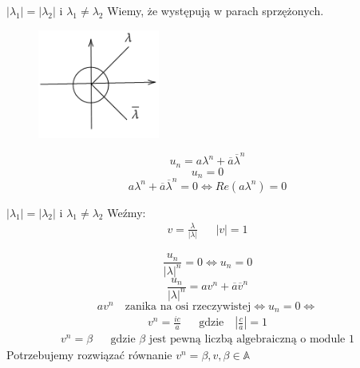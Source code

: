 \documentclass[handout]{beamer}
\def\A{\mathbb{A}}
\theoremstyle{definition}
\theoremstyle{named}
\begin{document}
\begin{frame}{$|\lambda_1| = |\lambda_2|$ i $\lambda_1 \neq \lambda_2$}
Wiemy, że występują w parach sprzężonych. 

\begin{figure}
    \centering
    \includegraphics[width=40mm]{img/skolem-1.png}
\end{figure}

\pause 
\begin{equation*}
    u_n = a \lambda^{n} + \overline{a} \overline{\lambda}^{n} 
\end{equation*}
\pause 
\begin{equation*}
    u_n = 0 
\end{equation*}
\pause 
\begin{equation*}
    a \lambda^{n} + \overline{a} \overline{\lambda}^{n} = 0 \iff Re(a {\lambda^{n}}) = 0 
\end{equation*} 


\end{frame}
    
\begin{frame}{$|\lambda_1| = |\lambda_2|$ i $\lambda_1 \neq \lambda_2$}
Weźmy: 
\begin{align*}
    v = \frac{\lambda}{|\lambda|} && |v| = 1
\end{align*}
\pause 

$$\frac{u_n}{|\lambda|^{n}} = 0 \iff u_n = 0$$
\pause
$$\frac{u_n}{|\lambda|^n} = a v^{n} + \overline{a} \overline{v} ^{n} $$
\pause
\begin{equation*}
    a v^{n} \quad  \text{zanika na osi rzeczywistej} \iff u_n = 0 \iff 
\end{equation*}
\begin{align*}
    v^{n} = \frac{i c}{a} && \text{gdzie} \quad |\frac{c}{a}| = 1
\end{align*}
\begin{align*}
    v^{n} = \beta && \text{gdzie $\beta$ jest pewną liczbą algebraiczną o module 1}
\end{align*}
\pause
Potrzebujemy rozwiązać równanie $v^{n} = \beta, v, \beta \in \A$

\end{frame}
\end{document}

